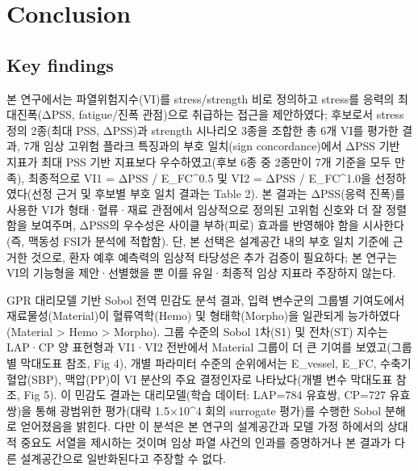 \documentclass[preprint,12pt]{elsarticle}
\begin{document}
\section{Conclusion}

\subsection{Key findings}
본 연구에서는 파열위험지수(VI)를 stress/strength 비로 정의하고 stress를 응력의 최대진폭(ΔPSS, fatigue/진폭 관점)으로 취급하는 접근을 제안하였다; 후보로서 stress 정의 2종(최대 PSS, ΔPSS)과 strength 시나리오 3종을 조합한 총 6개 VI를 평가한 결과, 7개 임상 고위험 플라크 특징과의 부호 일치(sign concordance)에서 ΔPSS 기반 지표가 최대 PSS 기반 지표보다 우수하였고(후보 6종 중 2종만이 7개 기준을 모두 만족), 최종적으로 VI1 = ΔPSS / E\_FC\textasciicircum {0.5} 및 VI2 = ΔPSS / E\_FC\textasciicircum {1.0}을 선정하였다(선정 근거 및 후보별 부호 일치 결과는 Table 2). 본 결과는 ΔPSS(응력 진폭)를 사용한 VI가 형태·혈류·재료 관점에서 임상적으로 정의된 고위험 신호와 더 잘 정렬함을 보여주며, ΔPSS의 우수성은 사이클 부하(피로) 효과를 반영해야 함을 시사한다(즉, 맥동성 FSI가 분석에 적합함). 단, 본 선택은 설계공간 내의 부호 일치 기준에 근거한 것으로, 환자 예후 예측력의 임상적 타당성은 추가 검증이 필요하다; 본 연구는 VI의 기능형을 제안·선별했을 뿐 이를 유일·최종적 임상 지표라 주장하지 않는다.

GPR 대리모델 기반 Sobol 전역 민감도 분석 결과, 입력 변수군의 그룹별 기여도에서 재료물성(Material)이 혈류역학(Hemo) 및 형태학(Morpho)을 일관되게 능가하였다(Material > Hemo > Morpho). 그룹 수준의 Sobol 1차(S1) 및 전차(ST) 지수는 LAP·CP 양 표현형과 VI1·VI2 전반에서 Material 그룹이 더 큰 기여를 보였고(그룹별 막대도표 참조, Fig 4), 개별 파라미터 수준의 순위에서는 E\_vessel, E\_FC, 수축기 혈압(SBP), 맥압(PP)이 VI 분산의 주요 결정인자로 나타났다(개별 변수 막대도표 참조, Fig 5). 이 민감도 결과는 대리모델(학습 데이터: LAP=784 유효쌍, CP=727 유효쌍)을 통해 광범위한 평가(대략 1.5×10\textasciicircum 4 회의 surrogate 평가)를 수행한 Sobol 분해로 얻어졌음을 밝힌다. 다만 이 분석은 본 연구의 설계공간과 모델 가정 하에서의 상대적 중요도 서열을 제시하는 것이며 임상 파열 사건의 인과를 증명하거나 본 결과가 다른 설계공간으로 일반화된다고 주장할 수 없다.
\end{document}
